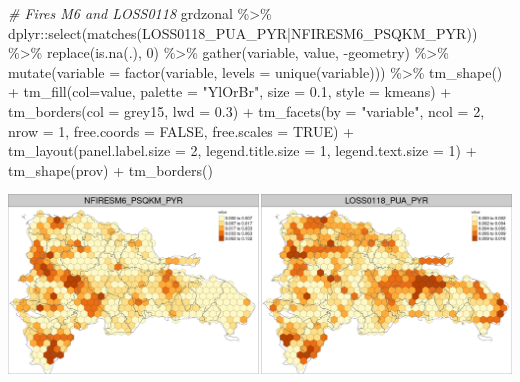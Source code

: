 \documentclass[10pt,landscape,a3paper]{article}
\newenvironment{Shaded}{\begin{snugshade}}{\end{snugshade}}
\newcommand{\AttributeTok}[1]{\textcolor[rgb]{0.77,0.63,0.00}{#1}}
\newcommand{\CommentTok}[1]{\textcolor[rgb]{0.56,0.35,0.01}{\textit{#1}}}
\newcommand{\ConstantTok}[1]{\textcolor[rgb]{0.00,0.00,0.00}{#1}}
\newcommand{\DecValTok}[1]{\textcolor[rgb]{0.00,0.00,0.81}{#1}}
\newcommand{\FloatTok}[1]{\textcolor[rgb]{0.00,0.00,0.81}{#1}}
\newcommand{\FunctionTok}[1]{\textcolor[rgb]{0.00,0.00,0.00}{#1}}
\newcommand{\NormalTok}[1]{#1}
\newcommand{\SpecialCharTok}[1]{\textcolor[rgb]{0.00,0.00,0.00}{#1}}
\newcommand{\StringTok}[1]{\textcolor[rgb]{0.31,0.60,0.02}{#1}}
\begin{document}
\begin{Shaded}
\begin{Highlighting}[]

\CommentTok{\# Fires M6 and LOSS0118}
\NormalTok{grdzonal }\SpecialCharTok{\%\textgreater{}\%}\NormalTok{ dplyr}\SpecialCharTok{::}\FunctionTok{select}\NormalTok{(}\FunctionTok{matches}\NormalTok{(}\StringTok{\textquotesingle{}LOSS0118\_PUA\_PYR|NFIRESM6\_PSQKM\_PYR\textquotesingle{}}\NormalTok{)) }\SpecialCharTok{\%\textgreater{}\%} 
  \FunctionTok{replace}\NormalTok{(}\FunctionTok{is.na}\NormalTok{(.), }\DecValTok{0}\NormalTok{) }\SpecialCharTok{\%\textgreater{}\%} 
  \FunctionTok{gather}\NormalTok{(variable, value, }\SpecialCharTok{{-}}\NormalTok{geometry) }\SpecialCharTok{\%\textgreater{}\%}
  \FunctionTok{mutate}\NormalTok{(}\AttributeTok{variable =} \FunctionTok{factor}\NormalTok{(variable, }\AttributeTok{levels =} \FunctionTok{unique}\NormalTok{(variable))) }\SpecialCharTok{\%\textgreater{}\%} 
  \FunctionTok{tm\_shape}\NormalTok{() }\SpecialCharTok{+}
  \FunctionTok{tm\_fill}\NormalTok{(}\AttributeTok{col=}\StringTok{\textquotesingle{}value\textquotesingle{}}\NormalTok{, }\AttributeTok{palette =} \StringTok{"YlOrBr"}\NormalTok{, }\AttributeTok{size =} \FloatTok{0.1}\NormalTok{, }\AttributeTok{style =} \StringTok{\textquotesingle{}kmeans\textquotesingle{}}\NormalTok{) }\SpecialCharTok{+}
  \FunctionTok{tm\_borders}\NormalTok{(}\AttributeTok{col =} \StringTok{\textquotesingle{}grey15\textquotesingle{}}\NormalTok{, }\AttributeTok{lwd =} \FloatTok{0.3}\NormalTok{) }\SpecialCharTok{+}
  \FunctionTok{tm\_facets}\NormalTok{(}\AttributeTok{by =} \StringTok{"variable"}\NormalTok{, }\AttributeTok{ncol =} \DecValTok{2}\NormalTok{, }\AttributeTok{nrow =} \DecValTok{1}\NormalTok{, }\AttributeTok{free.coords =} \ConstantTok{FALSE}\NormalTok{, }\AttributeTok{free.scales =} \ConstantTok{TRUE}\NormalTok{) }\SpecialCharTok{+}
  \FunctionTok{tm\_layout}\NormalTok{(}\AttributeTok{panel.label.size =} \DecValTok{2}\NormalTok{, }\AttributeTok{legend.title.size =} \DecValTok{1}\NormalTok{, }\AttributeTok{legend.text.size =} \DecValTok{1}\NormalTok{) }\SpecialCharTok{+}
  \FunctionTok{tm\_shape}\NormalTok{(prov) }\SpecialCharTok{+} \FunctionTok{tm\_borders}\NormalTok{()}
\end{Highlighting}
\end{Shaded}

\begin{center}\includegraphics{img/data-download-preparation-eda/zonal-long-term-grid-13} \end{center}
\end{document}
